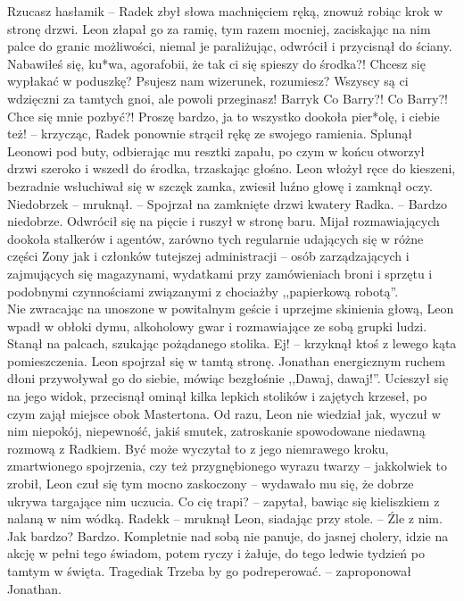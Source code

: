 \documentclass[../MAIN.tex]{subfiles}
\begin{document}
\xx Rzucasz hasłami\3k -- Radek zbył słowa machnięciem ręką, znowuż robiąc krok w stronę drzwi. Leon złapał go za ramię, tym razem mocniej, zaciskając na nim palce do granic możliwości, niemal je paraliżując, odwrócił i przycisnął do ściany.
\xx Nabawiłeś się, ku*wa, agorafobii, że tak ci się spieszy do środka?! Chcesz się wypłakać w poduszkę? Psujesz nam wizerunek, rozumiesz? Wszyscy są ci wdzięczni za tamtych gnoi, ale powoli przeginasz! Barry\3k
\xx Co Barry?! Co Barry?! Chce się mnie pozbyć?! Proszę bardzo, ja to wszystko dookoła pier*olę, i ciebie też! -- krzycząc, Radek ponownie strącił rękę ze swojego ramienia. Splunął Leonowi pod buty, odbierając mu resztki zapału, po czym w końcu otworzył drzwi szeroko i wszedł do środka, trzaskając głośno.
\qd
Leon włożył ręce do kieszeni, bezradnie wsłuchiwał się w szczęk zamka, zwiesił luźno głowę i zamknął oczy.
\sx Niedobrze\3k -- mruknął. -- Spojrzał na zamknięte drzwi kwatery Radka. -- Bardzo niedobrze.
\qd
Odwrócił się na pięcie i ruszył w stronę baru. Mijał rozmawiających dookoła stalkerów i agentów, zarówno tych regularnie udających się w różne części Zony jak i członków tutejszej administracji -- osób zarządzających i zajmujących się magazynami, wydatkami przy zamówieniach broni i sprzętu i podobnymi czynnościami związanymi z chociażby ,,papierkową robotą''.\\
Nie zwracając na unoszone w powitalnym geście i uprzejme skinienia głową, Leon wpadł w obłoki dymu, alkoholowy gwar i rozmawiające ze sobą grupki ludzi. Stanął na palcach, szukając pożądanego stolika.
\sx Ej! -- krzyknął ktoś z lewego kąta pomieszczenia. Leon spojrzał się w tamtą stronę.
\qd
Jonathan energicznym ruchem dłoni przywoływał go do siebie, mówiąc bezgłośnie ,,Dawaj, dawaj!''. Ucieszył się na jego widok, przecisnął ominął kilka lepkich stolików i zajętych krzeseł, po czym zajął miejsce obok Mastertona. Od razu, Leon nie wiedział jak, wyczuł w nim niepokój, niepewność, jakiś smutek, zatroskanie spowodowane niedawną rozmową z Radkiem. Być może wyczytał to z jego niemrawego kroku, zmartwionego spojrzenia, czy też przygnębionego wyrazu twarzy -- jakkolwiek to zrobił, Leon czuł się tym mocno zaskoczony -- wydawało mu się, że dobrze ukrywa targające nim uczucia.
\sx Co cię trapi? -- zapytał, bawiąc się kieliszkiem z nalaną w nim wódką.
\xx Radek\3k -- mruknął Leon, siadając przy stole. -- Źle z nim.
\xx Jak bardzo?
\xx Bardzo. Kompletnie nad sobą nie panuje, do jasnej cholery, idzie na akcję w pełni tego świadom, potem ryczy i żałuje, do tego ledwie tydzień po tamtym w święta. Tragedia\3k
\xx Trzeba by go podreperować. -- zaproponował Jonathan.
\end{document}
